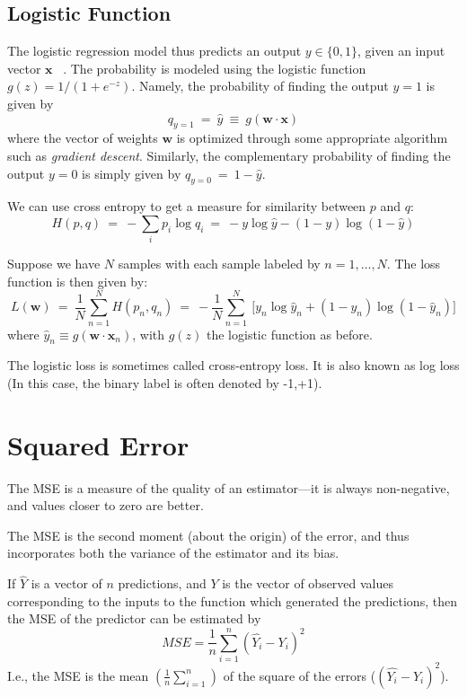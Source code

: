 \documentclass[hyperref, UTF-8]{ctexart}
\begin{document}
\subsection{Logistic Function}
The logistic regression model thus predicts an output $y \in \{0, 1\}$, given an
input vector $\mathbf {x}$ ~\cite{logloss}. The probability is modeled using the logistic function $g(z)=1/(1+e^{-z})$. Namely, the probability of finding the output  $y=1$ is given by
\begin{displaymath}
  q_{y=1}\ = \ \hat{y}\ \equiv \ g(\mathbf{w} \cdot \mathbf{x})
\end{displaymath}
where the vector of weights $\mathbf {w}$  is optimized through some appropriate
algorithm such as \emph{gradient descent}. Similarly, the complementary probability of
finding the output $y=0$ is simply given by $q_{{y=0}}\ =\ 1-{\hat  {y}}$.

We can use cross entropy to get a measure for similarity between $p$ and $q$:
\begin{displaymath}
H(p,q)\ =\ -\sum _{i}p_{i}\log q_{i}\ =\ -y\log {\hat {y}}-(1-y)\log(1-{\hat {y}})
\end{displaymath}

Suppose we have $N$ samples with each sample labeled by $n=1,\dots ,N$. The loss function is then given by:
\begin{displaymath}
 L(\mathbf {w} )\ =\ {\frac {1}{N}}\sum _{n=1}^{N}H(p_{n},q_{n})\ =\ -{\frac
   {1}{N}}\sum _{n=1}^{N}\ {\bigg [}y_{n}\log {\hat
   {y}}_{n}+(1-y_{n})\log(1-{\hat {y}}_{n}){\bigg ]}
\end{displaymath}
where ${\hat  {y}}_{n}\equiv g({\mathbf  {w}}\cdot {\mathbf  {x}}_{n})$, with $g(z)$ the logistic function as before.

The logistic loss is sometimes called cross-entropy loss. It is also known as log loss (In this case, the binary label is often denoted by {-1,+1}).
\section{Squared Error}
The MSE is a measure of the quality of an estimator—it is always non-negative, and values closer to zero are better.~\cite{mseloss}

The MSE is the second moment (about the origin) of the error, and thus
incorporates both the variance of the estimator and its bias.

If $\hat{Y}$ is a vector of $n$ predictions, and $Y$ is the vector of observed values corresponding to the inputs to the function which generated the predictions, then the MSE of the predictor can be estimated by
\begin{displaymath}
 {MSE}={\frac  {1}{n}}\sum_{{i=1}}^{n}({\hat  {Y_{i}}}-Y_{i})^{2}
\end{displaymath}
I.e., the MSE is the mean \begin{math}\left({\frac {1}{n}}\sum_{i=1}^{n}\right)\end{math} of the square of the errors ($({\hat  {Y_{i}}}-Y_{i})^{2}$).
\end{document}
